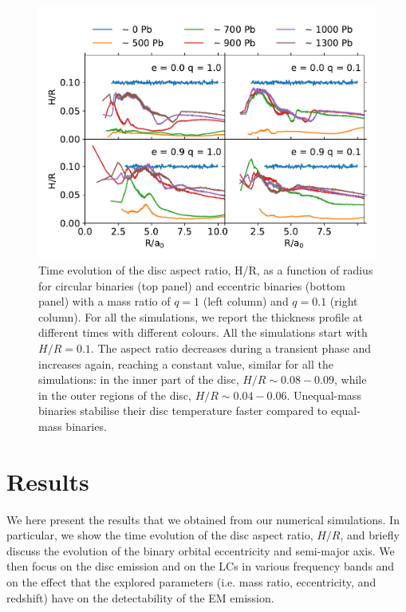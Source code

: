 \documentclass{aa}
\begin{document}
\begin{figure}
        \begin{center}
        \includegraphics[width=\columnwidth]{Figures/e09q01_hr01_md001_3aall.pdf}
    \caption{Time evolution of the disc aspect ratio, H/R, as a function of radius for circular binaries (top panel) and eccentric binaries (bottom panel) with a mass ratio of $q=1$ (left column) and $q=0.1$ (right column). For all the simulations, we report the thickness profile at different times with different colours. All the simulations start with $H/R=0.1$. The aspect ratio decreases during a transient phase and increases again, reaching a constant value, similar for all the simulations: in the inner part of the disc, $H/R \sim 0.08-0.09$, while in the outer regions of the disc, $H/R \sim 0.04-0.06$. Unequal-mass binaries stabilise their disc temperature faster compared to equal-mass binaries.
    \label{fig:HR}
    }
        \end{center}
\end{figure}




\section{Results}
\label{Results}

We here present the results that we obtained from our numerical simulations. In particular, we show the time evolution of the disc aspect ratio, $H/R$, and  briefly discuss the evolution of the binary orbital eccentricity and semi-major axis.  We then focus on the disc emission and on the LCs in various frequency bands and on the effect that the explored parameters (i.e. mass ratio, eccentricity, and redshift) have on the detectability of the EM emission. 
\end{document}
